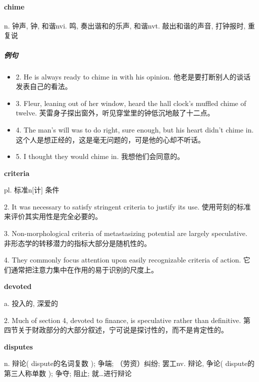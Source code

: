 \documentclass[12pt]{book}
\begin{document}
\vspace{12pt}

\paragraph{chime}

n. 钟声, 钟, 和谐nvi. 鸣, 奏出谐和的乐声, 和谐nvt. 敲出和谐的声音, 打钟报时, 重复说

\subparagraph{例句}

\begin{itemize}
    \item {2.  He is always ready to chime in with his opinion.  他老是要打断别人的谈话发表自己的看法。}
    \item {3.  Fleur, leaning out of her window, heard the hall clock's muffled chime of twelve.  芙雷身子探出窗外，听见穿堂里的钟低沉地敲了十二点。 }
    \item {4.  The man's will was to do right, sure enough, but his heart didn't chime in.  这个人是想正经的，这是毫无问题的，可是他的心却不听话。}
    \item {5.  I thought they would chime in.  我想他们会同意的。}
\end{itemize}

\vspace{12pt}

\textbf{criteria}

pl. 标准n[计] 条件

2.  It was necessary to satisfy stringent criteria to justify its use.  使用苛刻的标准来评价其实用性是完全必要的。 


3.  Non-morphological criteria of metastasizing potential are largely speculative.  非形态学的转移潜力的指标大部分是随机性的。 


4.  They commonly focus attention upon easily recognizable criteria of action.  它们通常把注意力集中在作用的易于识别的尺度上。 


\vspace{12pt}

\textbf{devoted}

a. 投入的, 深爱的

2.  Much of section 4, devoted to finance, is speculative rather than definitive.  第四节关于财政部分的大部分叙述，宁可说是探讨性的，而不是肯定性的。 


\vspace{12pt}

\textbf{disputes}

n. 辩论( dispute的名词复数 ); 争端; （劳资）纠纷; 罢工nv. 辩论, 争论( dispute的第三人称单数 ); 争夺; 阻止; 就…进行辩论
\end{document}
